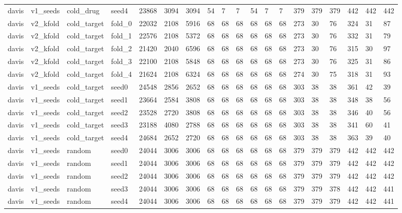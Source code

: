 \begin{table}[htbp]
\begin{tabular}{lllllllllllllllllll}
davis & v1\_seeds & cold\_drug & seed4 & 23868 & 3094 & 3094 & 54 & 7 & 7 & 54 & 7 & 7 & 379 & 379 & 379 & 442 & 442 & 442 \\
davis & v2\_kfold & cold\_target & fold\_0 & 22032 & 2108 & 5916 & 68 & 68 & 68 & 68 & 68 & 68 & 273 & 30 & 76 & 324 & 31 & 87 \\
davis & v2\_kfold & cold\_target & fold\_1 & 22576 & 2108 & 5372 & 68 & 68 & 68 & 68 & 68 & 68 & 273 & 30 & 76 & 332 & 31 & 79 \\
davis & v2\_kfold & cold\_target & fold\_2 & 21420 & 2040 & 6596 & 68 & 68 & 68 & 68 & 68 & 68 & 273 & 30 & 76 & 315 & 30 & 97 \\
davis & v2\_kfold & cold\_target & fold\_3 & 22100 & 2108 & 5848 & 68 & 68 & 68 & 68 & 68 & 68 & 273 & 30 & 76 & 325 & 31 & 86 \\
davis & v2\_kfold & cold\_target & fold\_4 & 21624 & 2108 & 6324 & 68 & 68 & 68 & 68 & 68 & 68 & 274 & 30 & 75 & 318 & 31 & 93 \\
davis & v1\_seeds & cold\_target & seed0 & 24548 & 2856 & 2652 & 68 & 68 & 68 & 68 & 68 & 68 & 303 & 38 & 38 & 361 & 42 & 39 \\
davis & v1\_seeds & cold\_target & seed1 & 23664 & 2584 & 3808 & 68 & 68 & 68 & 68 & 68 & 68 & 303 & 38 & 38 & 348 & 38 & 56 \\
davis & v1\_seeds & cold\_target & seed2 & 23528 & 2720 & 3808 & 68 & 68 & 68 & 68 & 68 & 68 & 303 & 38 & 38 & 346 & 40 & 56 \\
davis & v1\_seeds & cold\_target & seed3 & 23188 & 4080 & 2788 & 68 & 68 & 68 & 68 & 68 & 68 & 303 & 38 & 38 & 341 & 60 & 41 \\
davis & v1\_seeds & cold\_target & seed4 & 24684 & 2652 & 2720 & 68 & 68 & 68 & 68 & 68 & 68 & 303 & 38 & 38 & 363 & 39 & 40 \\
davis & v1\_seeds & random & seed0 & 24044 & 3006 & 3006 & 68 & 68 & 68 & 68 & 68 & 68 & 379 & 379 & 379 & 442 & 442 & 442 \\
davis & v1\_seeds & random & seed1 & 24044 & 3006 & 3006 & 68 & 68 & 68 & 68 & 68 & 68 & 379 & 379 & 379 & 442 & 442 & 442 \\
davis & v1\_seeds & random & seed2 & 24044 & 3006 & 3006 & 68 & 68 & 68 & 68 & 68 & 68 & 379 & 379 & 379 & 442 & 442 & 442 \\
davis & v1\_seeds & random & seed3 & 24044 & 3006 & 3006 & 68 & 68 & 68 & 68 & 68 & 68 & 379 & 379 & 378 & 442 & 442 & 441 \\
davis & v1\_seeds & random & seed4 & 24044 & 3006 & 3006 & 68 & 68 & 68 & 68 & 68 & 68 & 379 & 379 & 379 & 442 & 442 & 441 \\

\end{tabular}
\end{table}
